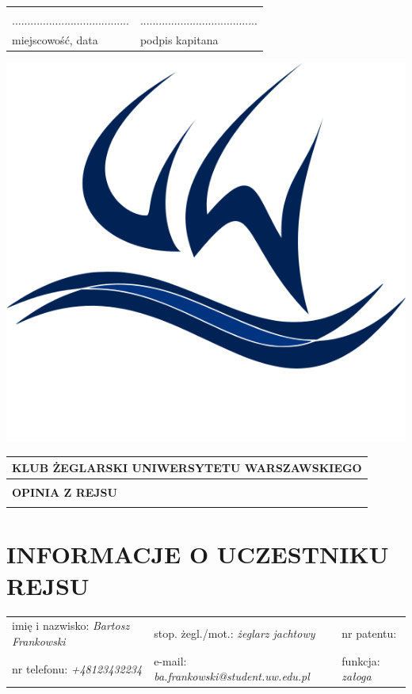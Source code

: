 \documentclass{article}
\begin{document}
\begin{tabularx}{\textwidth}{X X}
\\\\
...................................... & ......................................\\
miejscowość, data & podpis kapitana\\
\end{tabularx}
\newpage
\begin{minipage}{0.11\textwidth}
\includegraphics[width=\textwidth]{logo.png}
\end{minipage}
\begin{minipage}{0.89\textwidth}
\begin{tabularx}{\textwidth} { 
  | >{\centering\arraybackslash}X | }
 \hline
 \textbf{KLUB ŻEGLARSKI UNIWERSYTETU WARSZAWSKIEGO} \\
 \hline
 \\
 \textbf{\huge OPINIA Z REJSU} \\
 \\
\hline
\end{tabularx}
\end{minipage}

\section*{INFORMACJE O UCZESTNIKU REJSU}
\begin{tabularx}{\textwidth}{X X X}
imię i nazwisko: \textit{Bartosz Frankowski} & stop. żegl./mot.: \textit{żeglarz jachtowy} & nr patentu: \textit{ } \\
nr telefonu: \textit{+48123432234} & e-mail: \textit{ba.frankowski@student.uw.edu.pl} & funkcja: \textit{załoga} \\
\end{tabularx}
\end{document}
